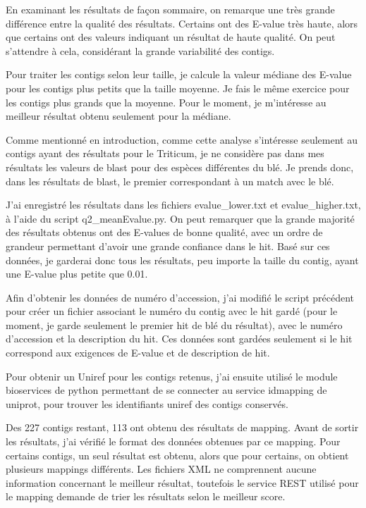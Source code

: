 \documentclass[10.9pt]{article} %
\begin{document}
En examinant les résultats de façon sommaire, on remarque une très grande différence entre la qualité des
résultats. Certains ont des E-value très haute, alors que certains ont des valeurs indiquant un résultat de
haute qualité. On peut s'attendre à cela, considérant la grande variabilité des contigs.

Pour traiter les contigs selon leur taille, je calcule la valeur médiane des E-value pour les contigs plus
petits que la taille moyenne. Je fais le même exercice pour les contigs plus grands que la moyenne. Pour
le moment, je m'intéresse au meilleur résultat obtenu seulement pour la médiane.

Comme mentionné en introduction, comme cette analyse s'intéresse seulement au contigs ayant des résultats
pour le Triticum, je ne considère pas dans mes résultats les valeurs de blast pour des espèces différentes
du blé. Je prends donc, dans les résultats de blast, le premier correspondant à un match avec le blé.

J'ai enregistré les résultats dans les fichiers evalue\_lower.txt et evalue\_higher.txt, à l'aide du script
q2\_meanEvalue.py. On peut remarquer que la grande majorité des résultats  obtenus ont des E-values de bonne
qualité, avec un ordre de grandeur permettant d'avoir une grande confiance dans le hit. Basé sur ces données,
je garderai donc tous les résultats, peu importe la taille du contig, ayant une E-value plus petite que 0.01.

Afin d'obtenir les données de numéro d'accession, j'ai modifié le script précédent pour créer un fichier associant
le numéro du contig avec le hit gardé (pour le moment, je garde seulement le premier hit de blé du résultat), avec
le numéro d'accession et la description du hit. Ces données sont gardées seulement si le hit correspond aux
exigences de E-value et de description de hit.

Pour obtenir un Uniref pour les contigs retenus, j'ai ensuite utilisé le module bioservices de python permettant
de se connecter au service idmapping de uniprot, pour trouver les identifiants uniref des contigs conservés.

Des 227 contigs restant, 113 ont obtenu des résultats de mapping. Avant de sortir les résultats, j'ai vérifié
le format des données obtenues par ce mapping. Pour certains contigs, un seul résultat est obtenu, alors que
pour certains, on obtient plusieurs mappings différents. Les fichiers XML ne comprennent aucune information
concernant le meilleur résultat, toutefois le service REST utilisé pour le mapping demande de trier les
résultats selon le meilleur score.
\end{document}
